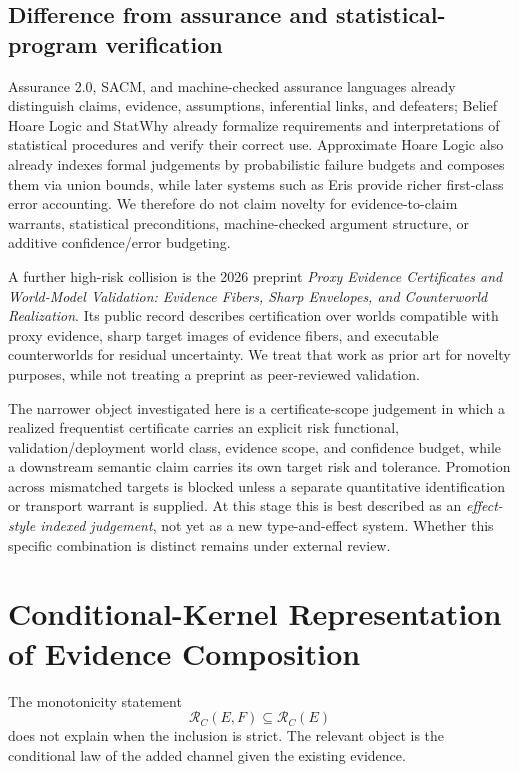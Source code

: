 \documentclass[11pt]{article}
\begin{document}
\subsection{Difference from assurance and statistical-program verification}

Assurance 2.0, SACM, and machine-checked assurance languages already distinguish
claims, evidence, assumptions, inferential links, and defeaters; Belief Hoare
Logic and StatWhy already formalize requirements and interpretations of
statistical procedures and verify their correct use. Approximate Hoare Logic
also already indexes formal judgements by probabilistic failure budgets and
composes them via union bounds, while later systems such as Eris provide richer
first-class error accounting. We therefore do not claim novelty for
evidence-to-claim warrants, statistical preconditions, machine-checked argument
structure, or additive confidence/error budgeting.

A further high-risk collision is the 2026 preprint \emph{Proxy Evidence
Certificates and World-Model Validation: Evidence Fibers, Sharp Envelopes, and
Counterworld Realization}. Its public record describes certification over
worlds compatible with proxy evidence, sharp target images of evidence fibers,
and executable counterworlds for residual uncertainty. We treat that work as
prior art for novelty purposes, while not treating a preprint as peer-reviewed
validation.

The narrower object investigated here is a certificate-scope judgement in
which a realized frequentist certificate carries an explicit risk functional,
validation/deployment world class, evidence scope, and confidence budget, while
a downstream semantic claim carries its own target risk and tolerance.
Promotion across mismatched targets is blocked unless a separate quantitative
identification or transport warrant is supplied. At this stage this is best
described as an \emph{effect-style indexed judgement}, not yet as a new
type-and-effect system. Whether this specific combination is distinct remains
under external review.

\section{Conditional-Kernel Representation of Evidence Composition}
\label{sec:composition}

The monotonicity statement
\[
\mathcal R_C(E,F)\subseteq\mathcal R_C(E)
\]
does not explain when the inclusion is strict. The relevant object is the
conditional law of the added channel given the existing evidence.
\end{document}
